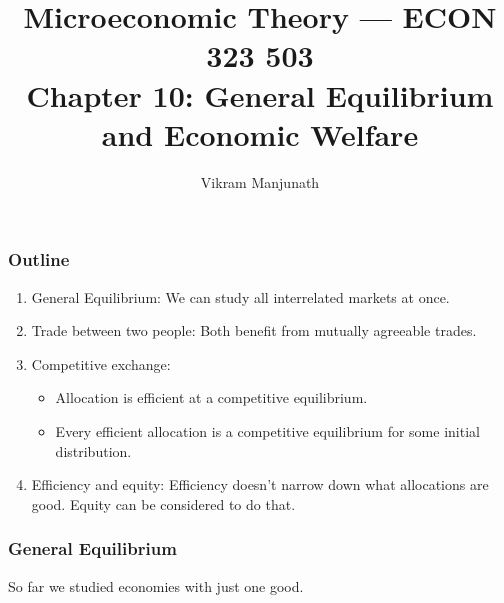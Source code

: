 \documentclass[xcolor=pdftex,dvipsnames]{beamer}
\title{Microeconomic Theory --- ECON 323 503 \\ Chapter 10: General
  Equilibrium and Economic Welfare}
\author{Vikram Manjunath}       %
\institute{Texas A\&M University}
\begin{document}
\maketitle

\begin{frame}
\frametitle{Outline}
\begin{enumerate}[<+->]
\item General Equilibrium: We can study all interrelated markets at
  once.
\item Trade between two people: Both benefit from mutually agreeable
  trades.
\item Competitive exchange:
  \begin{itemize}
  \item Allocation is efficient at a competitive equilibrium.
  \item Every efficient allocation is a competitive equilibrium for
    some initial distribution.
  \end{itemize}
\item  Efficiency and equity: Efficiency doesn't narrow down what
  allocations are good. Equity can be considered to do that.
\end{enumerate}
\end{frame}

\begin{frame}
  \frametitle{General Equilibrium}
  So far we studied economies with just one good. 



  \bigskip
{}

  \bigskip
{}

  \bigskip
{}

\end{frame}
\end{document}
